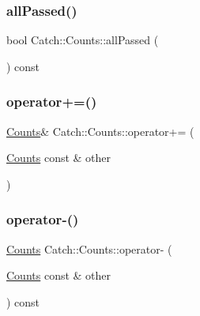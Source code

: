 \mbox{\label{struct_catch_1_1_counts_a84999490e0ecaa3de5e121bf48eda1b3}} 
\subsubsection{\texorpdfstring{all\+Passed()}{allPassed()}}
{\footnotesize\ttfamily bool Catch\+::\+Counts\+::all\+Passed (\begin{DoxyParamCaption}{ }\end{DoxyParamCaption}) const\hspace{0.3cm}{\ttfamily [inline]}}

\mbox{\label{struct_catch_1_1_counts_a322a89475cd2cc039140ef371e973677}} 
\subsubsection{\texorpdfstring{operator+=()}{operator+=()}}
{\footnotesize\ttfamily \hyperlink{struct_catch_1_1_counts}{Counts}\& Catch\+::\+Counts\+::operator+= (\begin{DoxyParamCaption}\item[{\hyperlink{struct_catch_1_1_counts}{Counts} const \&}]{other }\end{DoxyParamCaption})\hspace{0.3cm}{\ttfamily [inline]}}

\mbox{\label{struct_catch_1_1_counts_aaa10666f559057e3e860d2a5a6fae4c4}} 
\subsubsection{\texorpdfstring{operator-\/()}{operator-()}}
{\footnotesize\ttfamily \hyperlink{struct_catch_1_1_counts}{Counts} Catch\+::\+Counts\+::operator-\/ (\begin{DoxyParamCaption}\item[{\hyperlink{struct_catch_1_1_counts}{Counts} const \&}]{other }\end{DoxyParamCaption}) const\hspace{0.3cm}{\ttfamily [inline]}}

